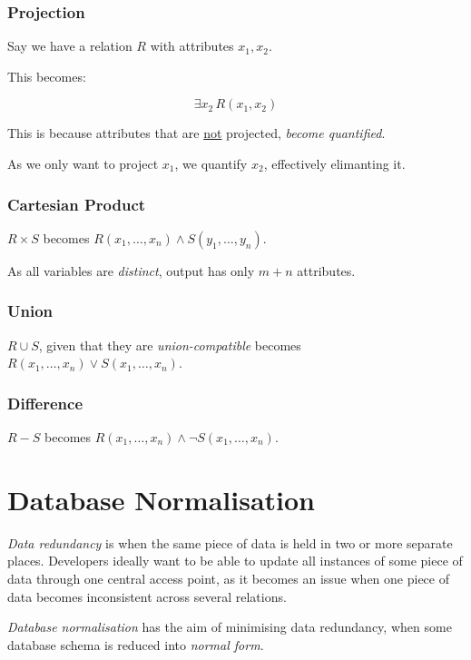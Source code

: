 \documentclass{article}
\begin{document}
\subsubsection{Projection}

Say we have a relation $R$ with attributes $x_1, x_2$.

This becomes:

\[ \exists x_2\, R(x_1, x_2)\]

This is because attributes that are \underline{not} projected, \textit{become quantified}.

As we only want to project $x_1$, we quantify $x_2$, effectively elimanting it.

\subsubsection{Cartesian Product}

$R \times S$ becomes $R(x_1, \ldots, x_n) \wedge S(y_1, \ldots, y_n)$.

As all variables are \textit{distinct}, output has only $m + n$ attributes.

\subsubsection{Union}

$R \cup S$, given that they are \textit{union-compatible} becomes $R(x_1, \ldots, x_n) \vee S(x_1, \ldots, x_n)$.

\subsubsection{Difference}

$R - S$ becomes $R(x_1, \ldots, x_n) \wedge \neg S(x_1, \ldots, x_n)$.

\section{Database Normalisation}

\textit{Data redundancy} is when the same piece of data is held in two or more separate places. Developers ideally want to be able to update all instances of some piece of data through one central access point, as it becomes an issue when one piece of data becomes inconsistent across several relations.

\textit{Database normalisation} has the aim of minimising data redundancy, when some database schema is reduced into \textit{normal form}.
\end{document}

